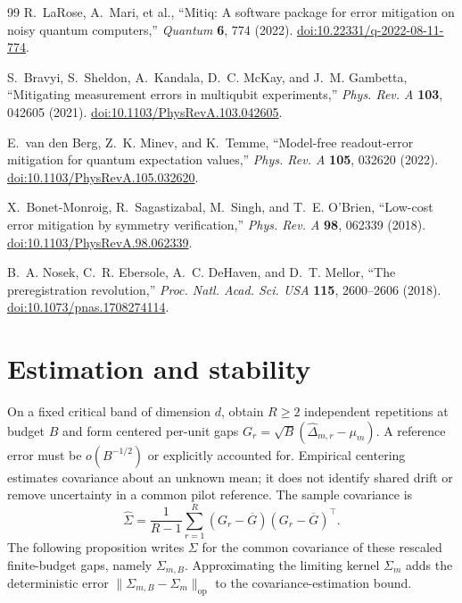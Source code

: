 \documentclass[a4paper,onecolumn,unpublished,nopdfoutputerror]{quantumarticle}
\theoremstyle{plain}
\theoremstyle{definition}
\newcommand{\1}{\mathbf{1}}
\newcommand{\op}{\mathrm{op}}
\begin{document}
\begin{thebibliography}{99}
R.~LaRose, A.~Mari, et al.,
``Mitiq: A software package for error mitigation on noisy quantum computers,''
\emph{Quantum} \textbf{6}, 774 (2022). \href{https://doi.org/10.22331/q-2022-08-11-774}{doi:10.22331/q-2022-08-11-774}.

S.~Bravyi, S.~Sheldon, A.~Kandala, D.~C. McKay, and J.~M. Gambetta,
``Mitigating measurement errors in multiqubit experiments,''
\emph{Phys. Rev. A} \textbf{103}, 042605 (2021). \href{https://doi.org/10.1103/PhysRevA.103.042605}{doi:10.1103/PhysRevA.103.042605}.

E.~van den Berg, Z.~K. Minev, and K.~Temme,
``Model-free readout-error mitigation for quantum expectation values,''
\emph{Phys. Rev. A} \textbf{105}, 032620 (2022). \href{https://doi.org/10.1103/PhysRevA.105.032620}{doi:10.1103/PhysRevA.105.032620}.

X.~Bonet-Monroig, R.~Sagastizabal, M.~Singh, and T.~E. O'Brien,
``Low-cost error mitigation by symmetry verification,''
\emph{Phys. Rev. A} \textbf{98}, 062339 (2018). \href{https://doi.org/10.1103/PhysRevA.98.062339}{doi:10.1103/PhysRevA.98.062339}.

B.~A. Nosek, C.~R. Ebersole, A.~C. DeHaven, and D.~T. Mellor,
``The preregistration revolution,''
\emph{Proc. Natl. Acad. Sci. USA} \textbf{115}, 2600--2606 (2018). \href{https://doi.org/10.1073/pnas.1708274114}{doi:10.1073/pnas.1708274114}.

\end{thebibliography}

\appendix

\section{Estimation and stability}
\label{app:estimation_stability}

On a fixed critical band of dimension $d$, obtain $R\ge2$ independent repetitions at budget $B$ and form centered per-unit gaps $G_r=\sqrt B(\widehat\Delta_{m,r}-\mu_m)$. A reference error must be $o(B^{-1/2})$ or explicitly accounted for. Empirical centering estimates covariance about an unknown mean; it does not identify shared drift or remove uncertainty in a common pilot reference. The sample covariance is
\[
\widehat\Sigma=\frac1{R-1}\sum_{r=1}^R(G_r-\overline G)(G_r-\overline G)^\top.
\]
The following proposition writes $\Sigma$ for the common covariance of these rescaled finite-budget gaps, namely $\Sigma_{m,B}$. Approximating the limiting kernel $\Sigma_m$ adds the deterministic error $\|\Sigma_{m,B}-\Sigma_m\|_{\op}$ to the covariance-estimation bound.
\end{document}
